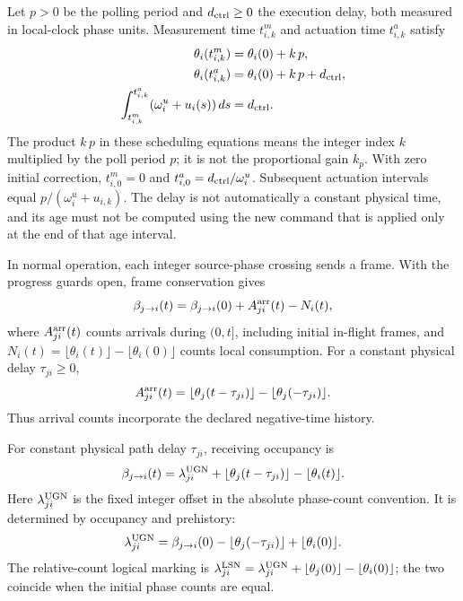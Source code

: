 Let $p>0$ be the polling period and $d_{\rm ctrl}\ge0$ the execution delay,
both measured in local-clock phase units. Measurement time $t^m_{i,k}$
and actuation time $t^a_{i,k}$ satisfy
\begin{align}
 \theta_i(t^m_{i,k})&=\theta_i(0)+k\,p,\nonumber\\
 \theta_i(t^a_{i,k})&=\theta_i(0)+k\,p+d_{\rm ctrl},\nonumber\\
 \int_{t^m_{i,k}}^{t^a_{i,k}}(\omega_i^u+u_i(s))\,ds&=d_{\rm ctrl}.
 \label{detail:eq:fpi_local_schedule}
\end{align}
The product $k\,p$ in these scheduling equations means the integer index
$k$ multiplied by the poll period $p$; it is not the proportional gain
$k_p$. With zero initial correction, $t^m_{i,0}=0$ and
$t^a_{i,0}=d_{\rm ctrl}/\omega_i^u$. Subsequent actuation intervals equal
$p/(\omega_i^u+u_{i,k})$. The delay is not automatically a constant
physical time, and its age must not be computed using the new command
that is applied only at the end of that age interval.

In normal operation, each integer source-phase crossing sends a frame.
With the progress guards open, frame conservation gives
\begin{equation}
 \beta_{j\to i}(t)=\beta_{j\to i}(0)+A^{\rm arr}_{ji}(t)-N_i(t),
 \label{detail:eq:fpi_count_balance}
\end{equation}
where $A^{\rm arr}_{ji}(t)$ counts arrivals during $(0,t]$, including
initial in-flight frames, and
$N_i(t)=\lfloor\theta_i(t)\rfloor-\lfloor\theta_i(0)\rfloor$ counts
local consumption. For a constant physical delay $\tau_{ji}\ge0$,
\begin{equation}
 A^{\rm arr}_{ji}(t)=\lfloor\theta_j(t-\tau_{ji})\rfloor
                  -\lfloor\theta_j(-\tau_{ji})\rfloor.
 \label{detail:eq:fpi_fixed_delay_arrivals}
\end{equation}
Thus arrival counts incorporate the declared negative-time history.

For constant physical path delay $\tau_{ji}$, receiving occupancy is
\begin{equation}
 \beta_{j\to i}(t)=\lambda^{\rm UGN}_{ji}
 +\lfloor\theta_j(t-\tau_{ji})\rfloor-\lfloor\theta_i(t)\rfloor.
 \label{detail:eq:fpd_continuous_fifo}
\end{equation}
Here $\lambda^{\rm UGN}_{ji}$ is the fixed integer offset in the absolute
phase-count convention. It is determined by occupancy and prehistory:
\begin{equation}
 \lambda^{\rm UGN}_{ji}=\beta_{j\to i}(0)
 -\lfloor\theta_j(-\tau_{ji})\rfloor+\lfloor\theta_i(0)\rfloor.
 \label{detail:eq:fpd_ugn_init}
\end{equation}
The relative-count logical marking is
$\lambda^{\rm LSN}_{ji}=\lambda^{\rm UGN}_{ji}
+\lfloor\theta_j(0)\rfloor-\lfloor\theta_i(0)\rfloor$;
the two coincide when the initial phase counts are equal.

